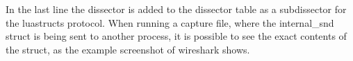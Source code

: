 In the last line the \gls{dissector} is added to the \gls{dissector} table as a subdissector for the luastructs \gls{protocol}.
When running a capture file, where the internal\_snd \gls{struct} is being sent to another \gls{process}, it is possible to see the exact contents of the \gls{struct}, as the example screenshot of \Gls{wireshark} shows.

\newpage
{}


